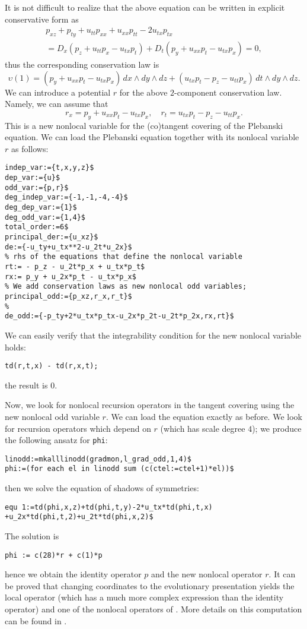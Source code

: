It is not difficult to realize that the above equation can be written in
explicit conservative form as
\begin{multline*}
    p_{xz}+p_{ty}+u_{tt}p_{xx}+u_{xx}p_{tt}-2u_{tx}p_{tx} \\
    =D_x(p_z+u_{tt}p_x-u_{tx}p_t)+D_t(p_y+u_{xx}p_t-u_{tx}p_x)=0,
\end{multline*}
thus the corresponding conservation law is
\begin{equation}
  \label{eq:32}
  \upsilon(1)= (p_y+u_{xx}p_t-u_{tx}p_x)\,dx\wedge dy\wedge dz+
          (u_{tx}p_t-p_z-u_{tt}p_x)\,dt\wedge dy\wedge dz.
        \end{equation}
We can introduce a potential $r$ for the above $2$-component conservation
law. Namely, we can assume that
\begin{equation}\label{eq:101}
  r_x = p_y+u_{xx}p_t-u_{tx}p_x,\quad r_t = u_{tx}p_t-p_z-u_{tt}p_x.
\end{equation}
This is a new nonlocal variable for the (co)tangent covering of the Plebanski
equation. We can load the Plebanski equation together with its nonlocal
variable $r$ as follows:
\begin{verbatim}
indep_var:={t,x,y,z}$
dep_var:={u}$
odd_var:={p,r}$
deg_indep_var:={-1,-1,-4,-4}$
deg_dep_var:={1}$
deg_odd_var:={1,4}$
total_order:=6$
principal_der:={u_xz}$
de:={-u_ty+u_tx**2-u_2t*u_2x}$
% rhs of the equations that define the nonlocal variable
rt:= - p_z - u_2t*p_x + u_tx*p_t$
rx:= p_y + u_2x*p_t - u_tx*p_x$
% We add conservation laws as new nonlocal odd variables;
principal_odd:={p_xz,r_x,r_t}$
%
de_odd:={-p_ty+2*u_tx*p_tx-u_2x*p_2t-u_2t*p_2x,rx,rt}$
\end{verbatim}
We can easily verify that the integrability condition for the new nonlocal
variable holds:
\begin{verbatim}
td(r,t,x) - td(r,x,t);
\end{verbatim}
the result is $0$.

Now, we look for nonlocal recursion operators in the tangent covering using
the new nonlocal odd variable $r$. We can load the equation exactly as before.
We look for recursion operators which depend on $r$ (which has scale degree
$4$); we produce the following ansatz for \texttt{phi}:
\begin{verbatim}
linodd:=mkalllinodd(gradmon,l_grad_odd,1,4)$
phi:=(for each el in linodd sum (c(ctel:=ctel+1)*el))$
\end{verbatim}
then we solve the equation of shadows of symmetries:
\begin{verbatim}
equ 1:=td(phi,x,z)+td(phi,t,y)-2*u_tx*td(phi,t,x)
+u_2x*td(phi,t,2)+u_2t*td(phi,x,2)$
\end{verbatim}
The solution is
\begin{verbatim}
phi := c(28)*r + c(1)*p
\end{verbatim}
hence we obtain the identity operator $p$ and the new
nonlocal operator $r$. It can be proved that
changing coordinates to the evolutionary presentation yields the local operator
(which has a much more complex expression than the identity operator) and one
of the nonlocal operators of \cite{NNS05}. More details on
this computation can be found in \cite{KVV12}.



